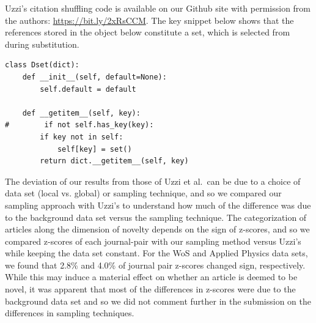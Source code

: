 \documentclass[11pt, oneside]{article}   	%
\begin{document}
Uzzi's citation shuffling code is available on our Github site with permission from the authors:
\url{https://bit.ly/2xRsCCM}. The key snippet below shows that the references stored in the object below constitute a set, which is selected from during substitution. 

\begin{verbatim}
class Dset(dict):
    def __init__(self, default=None):
        self.default = default

    def __getitem__(self, key):
#        if not self.has_key(key):
        if key not in self:
            self[key] = set()
        return dict.__getitem__(self, key)
\end{verbatim}



The deviation of our results from those of Uzzi et al.~can be due to a choice of data set (local vs. global) or sampling technique, and so we compared our sampling approach with Uzzi's to understand how much of the difference was due to the background data set versus the sampling technique. The categorization of articles along the dimension of novelty depends on the sign of z-scores, and so we compared z-scores of each journal-pair with our sampling method versus Uzzi's while keeping  the data set constant.  For the WoS and Applied Physics data sets, we found that 2.8\% and 4.0\% of journal pair z-scores changed sign, respectively.  While this may induce a material effect on whether an article is deemed to be novel, it was apparent that most of the differences in z-scores were due to the background data set and so we did not comment further in the submission on the differences in sampling techniques.
\end{document}
